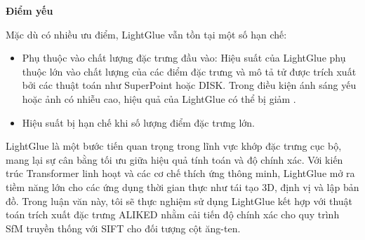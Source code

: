 \textbf{Điểm yếu}

Mặc dù có nhiều ưu điểm, LightGlue vẫn tồn tại một số hạn chế:

\begin{itemize}
    \item Phụ thuộc vào chất lượng đặc trưng đầu vào: Hiệu suất của LightGlue phụ thuộc lớn vào chất lượng của các điểm đặc trưng và mô tả tử được trích xuất bởi các thuật toán như SuperPoint hoặc DISK. Trong điều kiện ánh sáng yếu hoặc ảnh có nhiễu cao, hiệu quả của LightGlue có thể bị giảm \citep{Li2024Improved}.
    \item Hiệu suất bị hạn chế khi số lượng điểm đặc trưng lớn.
\end{itemize}

LightGlue là một bước tiến quan trọng trong lĩnh vực khớp đặc trưng cục bộ, mang lại sự cân bằng tối ưu giữa hiệu quả tính toán và độ chính xác. Với kiến trúc Transformer linh hoạt và các cơ chế thích ứng thông minh, LightGlue mở ra tiềm năng lớn cho các ứng dụng thời gian thực như tái tạo 3D, định vị và lập bản đồ. Trong luận văn này, tôi sẽ thực nghiệm sử dụng LightGlue kết hợp với thuật toán trích xuất đặc trưng ALIKED nhằm cải tiến độ chính xác cho quy trình SfM truyền thống với SIFT cho đối tượng cột ăng-ten.